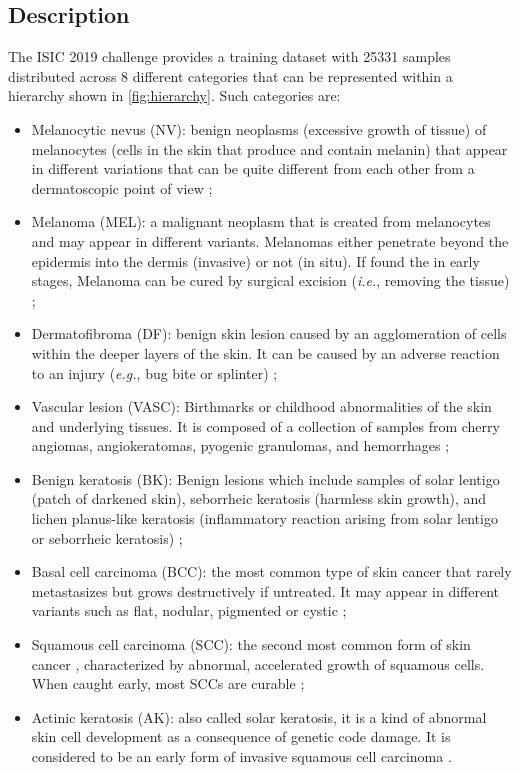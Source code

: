     \subsection{Description}
    The \ac{ISIC} 2019 challenge \cite{isic2019} provides a training dataset with 25331 samples distributed across 8 different categories that can be represented within a hierarchy shown in \autoref{fig:hierarchy}. Such categories are:
    \begin{itemize}
        \item Melanocytic nevus (NV): benign neoplasms (excessive growth of tissue) of melanocytes (cells in the skin that produce and contain melanin) that appear in different variations that can be quite different from each other from a dermatoscopic point of view \cite{ham10000};
                
        \item Melanoma (MEL): a malignant neoplasm that is created from melanocytes and may appear in different variants. Melanomas either penetrate beyond the epidermis into the dermis (invasive) or not (in situ). If found the in early stages, Melanoma can be cured by surgical excision (\textit{i.e.}, removing the tissue) \cite{ham10000};
        
        \item Dermatofibroma (DF): benign skin lesion caused by an agglomeration of cells within the deeper layers of the skin. It can be caused by an adverse reaction to an injury (\textit{e.g.}, bug bite or splinter) \cite{ham10000};
        
        \item Vascular lesion (VASC): Birthmarks or childhood abnormalities of the skin and underlying tissues. It is composed of a collection of samples from cherry angiomas, angiokeratomas, pyogenic granulomas, and hemorrhages \cite{ham10000};
        
        \item Benign keratosis (BK): Benign lesions which include samples of solar lentigo (patch of darkened skin), seborrheic keratosis (harmless skin growth), and lichen planus-like keratosis (inflammatory reaction arising from solar lentigo or seborrheic keratosis) \cite{isic2019};
        
        \item Basal cell carcinoma (BCC): the most common type of skin cancer \cite{Foundation2019} that rarely metastasizes but grows destructively if untreated. It may appear in different variants such as flat, nodular, pigmented or cystic \cite{ham10000};
        
        \item Squamous cell carcinoma (SCC): the second most common form of skin cancer \cite{Foundation2019}, characterized by abnormal, accelerated growth of squamous cells. When caught early, most SCCs are curable \cite{Foundation2019};
        
        \item Actinic keratosis (AK): also called solar keratosis, it is a kind of abnormal skin cell development as a consequence of genetic code damage. It is considered to be an early form of invasive squamous cell carcinoma \cite{ham10000}.
    \end{itemize}
    
